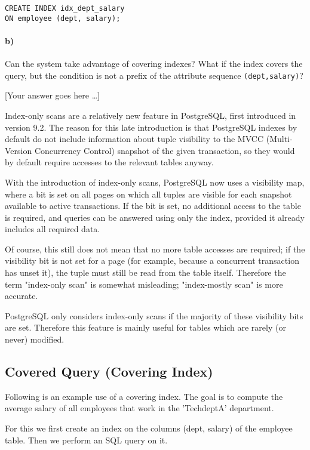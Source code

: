 \documentclass[11pt]{scrartcl}
\newcommand{\youranswerhere}{[Your answer goes here \ldots]}
\begin{document}
\begin{lstlisting}[style=dbtsql]
CREATE INDEX idx_dept_salary
ON employee (dept, salary);
\end{lstlisting}

\paragraph{b)}

Can the system take advantage of covering indexes? What if the index covers the query, but the condition is not a prefix of the attribute sequence \texttt{(dept,salary)}?

\youranswerhere{}

Index-only scans are a relatively new feature in PostgreSQL, first introduced in version 9.2.  The reason for this late introduction is that PostgreSQL indexes by default do not include information about tuple visibility to the MVCC (Multi-Version Concurrency Control) snapshot of the given transaction, so they would by default require accesses to the relevant tables anyway.

With the introduction of index-only scans, PostgreSQL now uses a visibility map, where a bit is set on all pages on which all tuples are visible for each snapshot available to active transactions.  If the bit is set, no additional access to the table is required, and queries can be answered using only the index, provided it already includes all required data.

Of course, this still does not mean that no more table accesses are required; if the visibility bit is not set for a page (for example, because a concurrent transaction has unset it), the tuple must still be read from the table itself.  Therefore the term "index-only scan" is somewhat misleading; "index-mostly scan" is more accurate.

PostgreSQL only considers index-only scans if the majority of these visibility bits are set.  Therefore this feature is mainly useful for tables which are rarely (or never) modified.

\subsection{Covered Query (Covering Index)}
Following is an example use of a covering index.  The goal is to compute the average salary of all employees that work in the 'TechdeptA' department.

For this we first create an index on the columns (dept, salary) of the employee table. Then we perform an SQL query on it.
\end{document}

